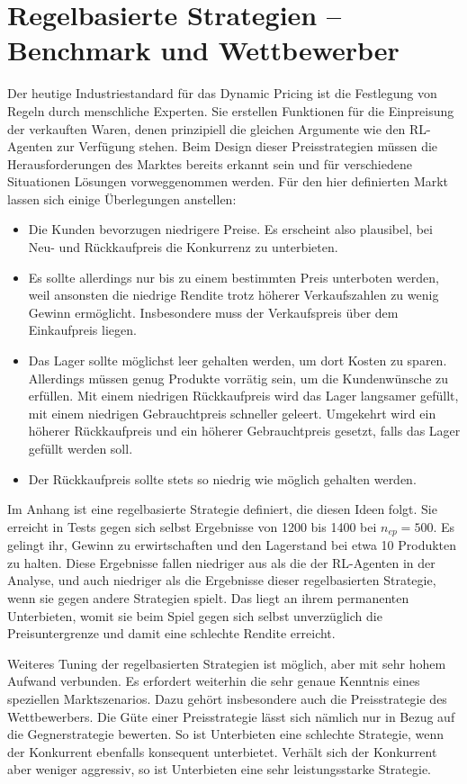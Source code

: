 \section{Regelbasierte Strategien -- Benchmark und Wettbewerber}
\label{section:rulebased}
Der heutige Industriestandard für das Dynamic Pricing ist die Festlegung von Regeln durch menschliche Experten.
Sie erstellen Funktionen für die Einpreisung der verkauften Waren, denen prinzipiell die gleichen Argumente wie den RL-Agenten zur Verfügung stehen.
Beim Design dieser Preisstrategien müssen die Herausforderungen des Marktes bereits erkannt sein und für verschiedene Situationen Lösungen vorweggenommen werden.
Für den hier definierten Markt lassen sich einige Überlegungen anstellen:
\begin{itemize}
	\item Die Kunden bevorzugen niedrigere Preise.
	Es erscheint also plausibel, bei Neu- und Rückkaufpreis die Konkurrenz zu unterbieten.
	\item Es sollte allerdings nur bis zu einem bestimmten Preis unterboten werden, weil ansonsten die niedrige Rendite trotz höherer Verkaufszahlen zu wenig Gewinn ermöglicht.
	Insbesondere muss der Verkaufspreis über dem Einkaufpreis liegen.
	\item Das Lager sollte möglichst leer gehalten werden, um dort Kosten zu sparen.
	Allerdings müssen genug Produkte vorrätig sein, um die Kundenwünsche zu erfüllen.
	Mit einem niedrigen Rückkaufpreis wird das Lager langsamer gefüllt, mit einem niedrigen Gebrauchtpreis schneller geleert.
	Umgekehrt wird ein höherer Rückkaufpreis und ein höherer Gebrauchtpreis gesetzt, falls das Lager gefüllt werden soll.
	\item Der Rückkaufpreis sollte stets so niedrig wie möglich gehalten werden.
\end{itemize}
Im Anhang ist eine regelbasierte Strategie definiert, die diesen Ideen folgt.
Sie erreicht in Tests gegen sich selbst Ergebnisse von 1200 bis 1400 bei $n_{ep}=500$.
Es gelingt ihr, Gewinn zu erwirtschaften und den Lagerstand bei etwa 10 Produkten zu halten.
Diese Ergebnisse fallen niedriger aus als die der RL-Agenten in der Analyse, und auch niedriger als die Ergebnisse dieser regelbasierten Strategie, wenn sie gegen andere Strategien spielt.
Das liegt an ihrem permanenten Unterbieten, womit sie beim Spiel gegen sich selbst unverzüglich die Preisuntergrenze und damit eine schlechte Rendite erreicht.

Weiteres Tuning der regelbasierten Strategien ist möglich, aber mit sehr hohem Aufwand verbunden.
Es erfordert weiterhin die sehr genaue Kenntnis eines speziellen Marktszenarios.
Dazu gehört insbesondere auch die Preisstrategie des Wettbewerbers.
Die Güte einer Preisstrategie lässt sich nämlich nur in Bezug auf die Gegnerstrategie bewerten.
So ist Unterbieten eine schlechte Strategie, wenn der Konkurrent ebenfalls konsequent unterbietet.
Verhält sich der Konkurrent aber weniger aggressiv, so ist Unterbieten eine sehr leistungsstarke Strategie.